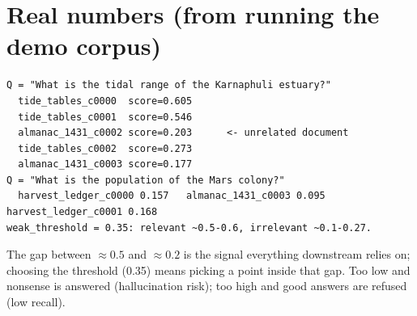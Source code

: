 \section{Real numbers (from running the demo corpus)}
\begin{lstlisting}[style=plain]
Q = "What is the tidal range of the Karnaphuli estuary?"
  tide_tables_c0000  score=0.605
  tide_tables_c0001  score=0.546
  almanac_1431_c0002 score=0.203      <- unrelated document
  tide_tables_c0002  score=0.273
  almanac_1431_c0003 score=0.177
Q = "What is the population of the Mars colony?"
  harvest_ledger_c0000 0.157   almanac_1431_c0003 0.095   harvest_ledger_c0001 0.168
weak_threshold = 0.35: relevant ~0.5-0.6, irrelevant ~0.1-0.27.
\end{lstlisting}
The gap between $\approx0.5$ and $\approx0.2$ is the signal everything downstream relies on; choosing the threshold (0.35) means picking a point inside that gap. Too low and nonsense is answered (hallucination risk); too high and good answers are refused (low recall).
